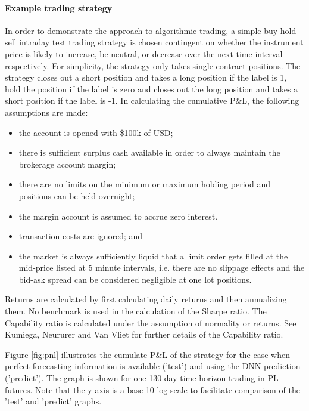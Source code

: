 \documentclass{article}
\begin{document}
\paragraph{Example trading strategy} In order to demonstrate the approach to algorithmic trading, a simple buy-hold-sell intraday test trading strategy is chosen contingent on whether the instrument price is likely to increase, be neutral, or decrease over the next
time interval respectively. For simplicity, the strategy only takes single contract positions. The strategy closes out a short position and takes a long position if the label is 1, hold the position if the label is zero and closes out the long position and takes a short position if the label is -1. In calculating the cumulative P\&L, the following assumptions are made:

\begin{itemize}
\item the account is opened with \$100k of USD;
\item there is sufficient surplus cash available in order to always maintain the brokerage account margin;
\item there are no limits on the minimum or maximum holding period and positions can be held overnight;
\item the margin account is assumed to accrue zero interest.
\item transaction costs are ignored; and
\item the market is always sufficiently liquid that a limit order gets filled at the mid-price listed at 5 minute intervals, i.e. there are no slippage effects and the bid-ask spread can be considered negligible at one lot positions.
\end{itemize}

Returns are calculated by first calculating daily returns and then annualizing them. No benchmark is used in the calculation of the Sharpe ratio.  The Capability ratio is calculated under the assumption of normality or returns. See Kumiega, Neururer and Van Vliet \cite{Vliet2014} for further details of the Capability ratio.  

Figure \ref{fig:pnl} illustrates the cumulate P\&L of the strategy for the case when perfect forecasting information is available ('test') and using the DNN prediction ('predict').  The graph is shown for one 130 day time horizon trading in PL futures. Note that the y-axis is a base 10 log scale to facilitate comparison of the 'test' and 'predict' graphs.
\end{document}
